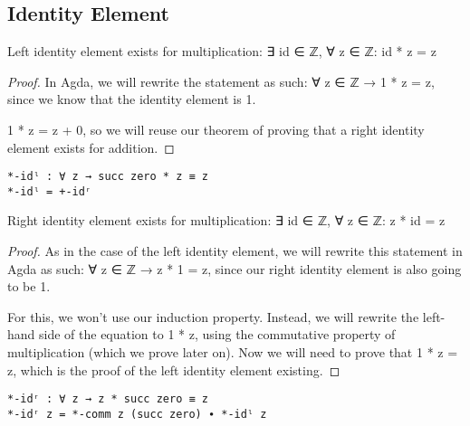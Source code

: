 \begin{listing}[H]
\section{Identity Element}

\begin{theorem}
  Left identity element exists for multiplication: ∃ id ∈ ℤ, ∀ z ∈ ℤ: id * z = z
\end{theorem}

\begin{proof}
  In Agda, we will rewrite the statement as such: ∀ z ∈ ℤ → 1 * z = z, since we know that the identity element is 1.

  1 * z = z + 0, so we will reuse our theorem of proving that a right identity element exists for addition.
\end{proof}

\begin{verbatim}
*-idˡ : ∀ z → succ zero * z ≡ z
*-idˡ = +-idʳ
\end{verbatim}
\caption{Agda proof of multiplication having a left identity element}
\end{listing}

\begin{theorem}
  Right identity element exists for multiplication: ∃ id ∈ ℤ, ∀ z ∈ ℤ: z * id = z
\end{theorem}

\begin{proof}
  As in the case of the left identity element, we will rewrite this statement in Agda as such: ∀ z ∈ ℤ → z * 1 = z, since our right identity element is also going to be 1.

  For this, we won't use our induction property. Instead, we will rewrite the left-hand side of the equation to 1 * z, using the commutative property of multiplication (which we prove later on). Now we will need to prove that 1 * z = z, which is the proof of the left identity element existing.
\end{proof}

\begin{listing}[H]
\begin{verbatim}
*-idʳ : ∀ z → z * succ zero ≡ z
*-idʳ z = *-comm z (succ zero) ∙ *-idˡ z
\end{verbatim}
\caption{Agda proof of multiplication having a right identity element}
\end{listing}


